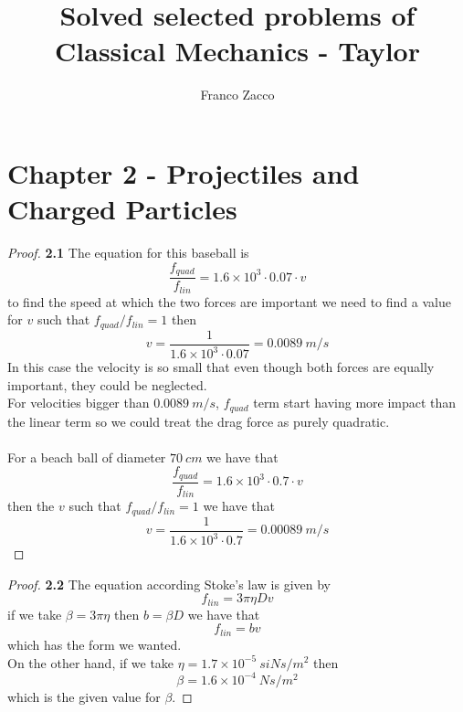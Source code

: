 \documentclass[11pt]{article}
\title{\textbf{Solved selected problems of Classical Mechanics - Taylor}}
\author{Franco Zacco}
\date{}
\theoremstyle{definition}
\begin{document}
\maketitle
\thispagestyle{empty}

\section*{Chapter 2 - Projectiles and Charged Particles}

	\begin{proof}{\textbf{2.1}}
        The equation for this baseball is
        $$\frac{f_{quad}}{f_{lin}} = 1.6 \times 10^3 \cdot 0.07 \cdot v$$
        to find the speed at which the two forces are important we need to find
        a value for $v$ such that $f_{quad}/f_{lin} = 1$ then
        $$v = \frac{1}{1.6 \times 10^3 \cdot 0.07} = 0.0089~m/s$$
        In this case the velocity is so small that even though both forces are
        equally important, they could be neglected.\\
        For velocities bigger than $0.0089~m/s$, $f_{quad}$ term start having
        more impact than the linear term so we could treat the drag force as
        purely quadratic.\\\\
        For a beach ball of diameter $70~cm$ we have that
        $$\frac{f_{quad}}{f_{lin}} = 1.6 \times 10^3 \cdot 0.7 \cdot v$$
        then the $v$ such that $f_{quad}/f_{lin} = 1$ we have that
        $$v = \frac{1}{1.6 \times 10^3 \cdot 0.7} = 0.00089~m/s$$

    \end{proof}
	\begin{proof}{\textbf{2.2}}
        The equation according Stoke's law is given by
        $$f_{lin} = 3 \pi \eta D v$$
        if we take $\beta = 3 \pi \eta$ then $b = \beta D$ we have that
        $$f_{lin} = bv$$
        which has the form we wanted.\\
        On the other hand, if we take $\eta = 1.7 \times 10^{-5}~si{Ns/m^2}$ then
        $$\beta = 1.6 \times 10^{-4}~\si{Ns/m^2}$$
        which is the given value for $\beta$.
    \end{proof}
\end{document}
